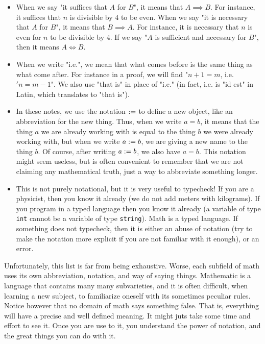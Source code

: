 \begin{itemize}
    \item When we say "it suffices that \( A \) for \( B \)", it means that \( A \implies B \). For instance, it suffices that \( n \) is divisible by \( 4 \) to be even. When we say "it is necessary that \( A \) for \( B \)", it means that \( B \implies A \). For instance, it is necessary that \( n \) is even for \( n \) to be divisible by \( 4 \). If we say "\( A \) is sufficient and necessary for \( B \)", then it means \( A \iff B \).
    
    \item When we write "i.e.", we mean that what comes before is the same thing as what come after. For instance in a proof, we will find "\( n + 1 = m \), i.e. \( 'n = m - 1 \)". We also use "that is" in place of "i.e." (in fact, i.e. is "id est" in Latin, which translates to "that is").
    
    \item In these notes, we use the notation \( := \) to define a new object, like an abbreviation for the new thing. Thus, when we write \( a = b \), it means that the thing \( a \) we are already working with is equal to the thing \( b \) we were already working with, but when we write \( a := b \), we are giving a new name to the thing \( b \). Of course, after writing \( a := b \), we also have \( a = b \). This notation might seem useless, but is often convenient to remember that we are not claiming any mathematical truth, just a way to abbreviate something longer.
     
    \item This is not purely notational, but it is very useful to typecheck! If you are a physicist, then you know it already (we do not add meters with kilograms). If you program in a typed language then you know it already (a variable of type \verb|int| cannot be a variable of type \verb|string|). Math is a typed language. If something does not typecheck, then it is either an abuse of notation (try to make the notation more explicit if you are not familiar with it enough), or an error.
\end{itemize}

Unfortunately, this list is far from being exhaustive. Worse, each subfield of math uses its own abbreviation, notation, and way of saying things. Mathematic is a language that contains many many subvarieties, and it is often difficult, when learning a new subject, to familiarize oneself with its sometimes peculiar rules. Notice however that no domain of math says something false. That is, everything will  have a precise and well defined meaning. It might juts take some time and effort to see it. Once you are use to it, you understand the power of notation, and the great things you can do with it. 
